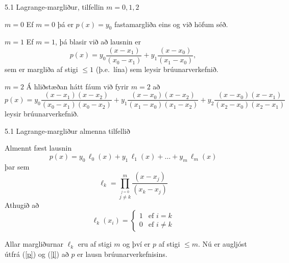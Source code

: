 \begin{frame}{5.1 Lagrange-margliður, tilfellin $m=0,1,2$} 
\begin{block}{$m=0$}
Ef $m = 0$ þá er 
$p(x) = y_0$ 
fastamargliða eins og við höfum séð. 
\end{block}
\pause
\begin{block}{$m=1$}
Ef $m = 1$, þá blasir við að lausnin er
\begin{equation*}
  p(x) = y_0 \frac{(x-x_1)}{(x_0-x_1)}
  + y_1 \frac{(x-x_0)}{(x_1-x_0)},
\end{equation*}
sem er margliða af stigi $\leq 1$ (þ.e.~lína) sem leysir brúunarverkefnið.
\end{block}
\pause
\begin{block}{$m=2$}
Á hliðstæðan hátt fáum við fyrir $m = 2$ að
\begin{equation*}
  p(x) = y_0 \frac{(x-x_1)(x-x_2)}{(x_0-x_1)(x_0-x_2)}
  + y_1 \frac{(x-x_0)(x-x_2)}{(x_1-x_0)(x_1-x_2)}
  + y_2 \frac{(x-x_0)(x-x_1)}{(x_2-x_0)(x_2-x_1)}
\end{equation*}
leysir brúunarverkefnið.
\end{block}
\end{frame}

\begin{frame}{5.1 Lagrange-margliður almenna tilfellið} 

 Almennt fæst lausnin
\begin{equation}
\label{p}
  p(x) = y_0 \, \ell_{0}(x) + y_1 \, \ell_{1}(x) 
  + \ldots + y_m \, \ell_{m}(x)
\end{equation}
þar sem
\begin{equation*}
  \ell_{k} = \prod\limits_{\stackrel{j=0}{j\not=k}}^m
  \frac{(x-x_j)}{(x_k-x_j)}
  \end{equation*}
\pause
Athugið að
\begin{equation}\label{l}
  \ell_{k}(x_i) = \left\{ \begin{array}{cc}
      1 & \text{ef } i = k \\
      0 & \text{ef } i \not= k
  \end{array} \right.
\end{equation}

\pause
\smallskip
Allar margliðurnar $\ell_{k}$ eru af stigi $m$ og því er $p$ af
stigi $\leq m$. 
Nú er augljóst útfrá (\ref{p}) og (\ref{l}) að $p$ er lausn brúunarverkefnisins. 
\end{frame}

